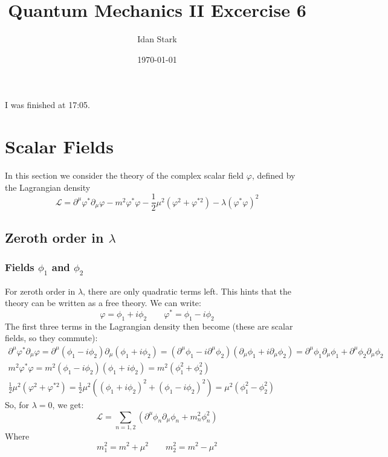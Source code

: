 \documentclass{article}
\title{Quantum Mechanics II Excercise 6}
\author{Idan Stark}
\date{\today}
\begin{document}
\maketitle

I was finished at 17:05.

\section{Scalar Fields}
In this section we consider the theory of the complex scalar field $\varphi$, defined by the Lagrangian density
\begin{equation}
    \mathcal{L} = \partial^\mu\varphi^*\partial_\mu\varphi - m^2\varphi^*\varphi - \frac{1}{2}\mu^2\left(\varphi^2 + \varphi^{*2}\right) - \lambda\left(\varphi^*\varphi\right)^2
\end{equation}
\subsection{Zeroth order in $\lambda$}
\subsubsection{Fields $\phi_1$ and $\phi_2$}
For zeroth order in $\lambda$, there are only quadratic terms left. This hints that the theory can be written as a free theory. We can write:
\begin{equation}
    \varphi = \phi_1 + i\phi_2
    \qquad
    \varphi^* = \phi_1 - i\phi_2
\end{equation}
The first three terms in the Lagrangian density then become (these are scalar fields, so they commute):
\begin{equation}
\begin{gathered}
    \partial^\mu\varphi^*\partial_\mu\varphi =
    \partial^\mu(\phi_1 - i\phi_2)\partial_\mu(\phi_1 + i\phi_2) =
    (\partial^\mu\phi_1 - i\partial^\mu\phi_2)(\partial_\mu\phi_1 + i\partial_\mu\phi_2) =
    \partial^\mu\phi_1\partial_\mu\phi_1 + \partial^\mu\phi_2\partial_\mu\phi_2
    \\
    m^2\varphi^*\varphi = m^2(\phi_1 - i\phi_2)(\phi_1 + i\phi_2) = m^2(\phi_1^2 + \phi_2^2)
    \\
    \frac{1}{2}\mu^2(\varphi^2 + \varphi^{*2}) = 
    \frac{1}{2}\mu^2((\phi_1 + i\phi_2)^2 + (\phi_1 - i\phi_2)^2) =
    \mu^2(\phi_1^2 - \phi_2^2)
\end{gathered}
\end{equation}
So, for $\lambda = 0$, we get:
\begin{equation}
     \mathcal{L} = \sum_{n=1,2} \left(\partial^\mu\phi_n\partial_\mu\phi_n + m_n^2\phi_n^2\right)
\end{equation}
Where
\begin{equation}
    m_1^2 = m^2 + \mu^2
    \qquad
    m_2^2 = m^2 - \mu^2
\end{equation}
\end{document}
